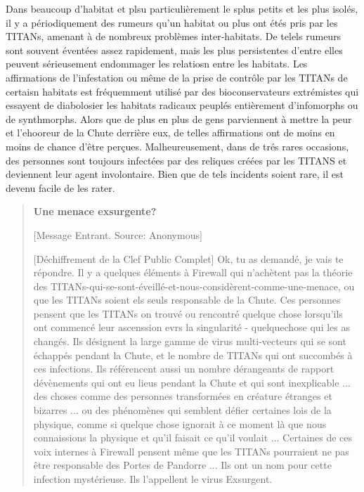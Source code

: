Dans beaucoup d'habitat et plsu particulièrement le splus petits et les plus isolés,  il y a périodiquement des rumeurs qu'un habitat ou plus ont étés pris par les TITANs, amenant à de nombreux problèmes inter-habitats. De telels rumeurs sont souvent éventées assez rapidement, mais les plus persistentes d'entre elles peuvent sérieusement endommager les relatiosn entre les habitats. Les affirmations de l'infestation ou même de la prise de contrôle par les TITANs de certaisn habitats est fréquemment utilisé par des bioconservateurs extrémistes qui essayent de diabolosier les habitats radicaux peuplés entièrement d'infomorphs ou de synthmorphs. Alors que de plus en plus de gens parviennent à mettre la peur et l'ehooreur de la Chute derrière eux, de telles affirmations ont de moins en moins de chance d'être perçues. Malheureusement, dans de trés rares occasions, des personnes sont toujours infectées par des reliques créées par les TITANS et deviennent leur agent involontaire. Bien que de tels incidents soient rare, il est devenu facile de les rater. 

\begin{quotation} \textbf{Une menace exsurgente?} 

   [Message Entrant. Source: Anonymous] 

   [Déchiffrement de la Clef Public Complet] Ok, tu as demandé, je vais te répondre. Il y a quelques éléments à Firewall qui n'achètent pas la théorie des TITANs-qui-se-sont-éveillé-et-nous-considèrent-comme-une-menace, ou que les TITANs soient els seuls responsable de la Chute. Ces personnes pensent que les TITANs on trouvé ou rencontré quelque chose lorsqu'ils ont commencé leur ascenssion evrs la singularité - quelquechose qui les as changés. Ils désignent la large gamme de virus multi-vecteurs qui se sont échappés pendant la Chute, et le nombre de TITANs qui ont succombés à ces infections. Ils référencent aussi un nombre dérangeants de rapport dévènements qui ont eu lieus pendant la Chute et qui sont inexplicable ... des choses comme des personnes transformées en créature étranges et bizarres ... ou des phénomènes qui semblent défier certaines lois de la physique, comme si quelque chose ignorait à ce moment là que nous connaissions la physique et qu'il faisait ce qu'il voulait ... Certaines de ces voix internes à Firewall pensent même que les TITANs pourraient ne pas être responsable des Portes de Pandorre ... Ils ont un nom pour cette infection mystérieuse. Ils l'appellent le virus Exsurgent. \end{quotation} 

